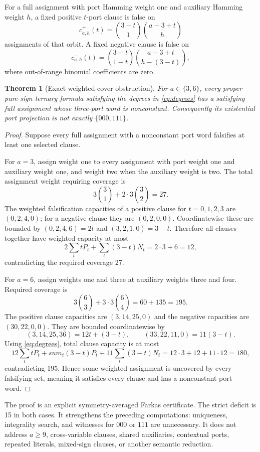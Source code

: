 \documentclass[11pt]{article}
\newtheorem{theorem}{Theorem}
\begin{document}
For a full assignment with port Hamming weight one and auxiliary Hamming weight $h$, a fixed positive $t$-port clause is false on
\[
 c^+_{a,h}(t)=\binom{3-t}{1}\binom{a-3+t}{h}
\]
assignments of that orbit.  A fixed negative clause is false on
\[
 c^-_{a,h}(t)=\binom{3-t}{1-t}\binom{a-3+t}{h-(3-t)},
\]
where out-of-range binomial coefficients are zero.

\begin{theorem}[Exact weighted-cover obstruction]
For $a\in\{3,6\}$, every proper pure-sign ternary formula satisfying the degrees in \eqref{eq:degrees} has a satisfying full assignment whose three-port word is nonconstant.  Consequently its existential port projection is not exactly $\{000,111\}$.
\end{theorem}
\begin{proof}
Suppose every full assignment with a nonconstant port word falsifies at least one selected clause.

For $a=3$, assign weight one to every assignment with port weight one and auxiliary weight one, and weight two when the auxiliary weight is two.  The total assignment weight requiring coverage is
\[
 3\binom31+2\cdot3\binom32=27.
\]
The weighted falsification capacities of a positive clause for $t=0,1,2,3$ are $(0,2,4,0)$; for a negative clause they are $(0,2,0,0)$.  Coordinatewise these are bounded by $(0,2,4,6)=2t$ and $(3,2,1,0)=3-t$.  Therefore all clauses together have weighted capacity at most
\[
 2\sum_t tP_t+\sum_t(3-t)N_t=2\cdot3+6=12,
\]
contradicting the required coverage 27.

For $a=6$, assign weights one and three at auxiliary weights three and four.  Required coverage is
\[
 3\binom63+3\cdot3\binom64=60+135=195.
\]
The positive clause capacities are $(3,14,25,0)$ and the negative capacities are $(30,22,0,0)$.  They are bounded coordinatewise by
\[
 (3,14,25,36)=12t+(3-t),\qquad
 (33,22,11,0)=11(3-t).
\]
Using \eqref{eq:degrees}, total clause capacity is at most
\[
 12\sum_t tP_t+sum_t(3-t)P_t+11\sum_t(3-t)N_t
 =12\cdot3+12+11\cdot12=180,
\]
contradicting 195.  Hence some weighted assignment is uncovered by every falsifying set, meaning it satisfies every clause and has a nonconstant port word.
\end{proof}

The proof is an explicit symmetry-averaged Farkas certificate.  The strict deficit is 15 in both cases.  It strengthens the preceding computations: uniqueness, integrality search, and witnesses for $000$ or $111$ are unnecessary.  It does not address $a\ge9$, cross-variable clauses, shared auxiliaries, contextual ports, repeated literals, mixed-sign clauses, or another semantic reduction.
\end{document}
